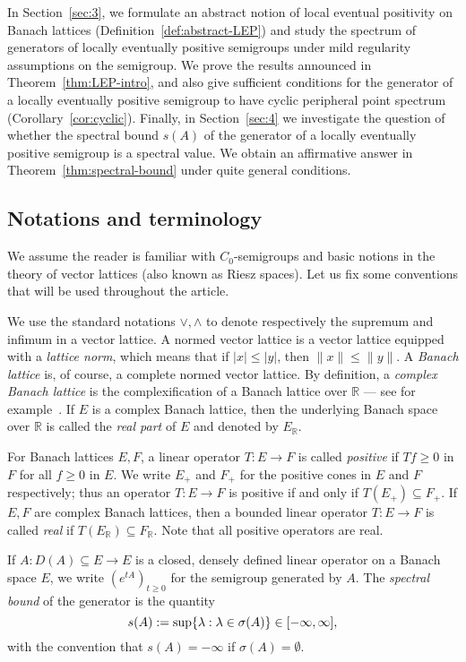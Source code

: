 \documentclass[sn-mathphys]{sn-jnl}%
\theoremstyle{thmstyleone}
\theoremstyle{thmstylethree}
\let\Re\relax
\DeclareMathOperator{\Re}{Re}
\newcommand{\RR}{\mathbb{R}}
\begin{document}
In Section~\ref{sec:3}, we formulate an abstract notion of local eventual positivity on Banach lattices (Definition~\ref{def:abstract-LEP}) and study the spectrum of generators of locally eventually positive semigroups under mild regularity assumptions on the semigroup. We prove the results announced in Theorem~\ref{thm:LEP-intro}, and also give sufficient conditions for the generator of a locally eventually positive semigroup to have cyclic peripheral point spectrum (Corollary~\ref{cor:cyclic}). Finally, in Section~\ref{sec:4} we investigate the question of whether the spectral bound $s(A)$ of the generator of a locally eventually positive semigroup is a spectral value. We obtain an affirmative answer in Theorem~\ref{thm:spectral-bound} under quite general conditions.

\subsection*{Notations and terminology}
We assume the reader is familiar with $C_0$-semigroups and basic notions in the theory of vector lattices (also known as Riesz spaces). Let us fix some conventions that will be used throughout the article.

We use the standard notations $\vee, \wedge$ to denote respectively the supremum and infimum in a vector lattice. A normed vector lattice is a vector lattice equipped with a \emph{lattice norm}, which means that if $\lvert x\rvert \le \lvert y\rvert$, then $\|x\|\le \|y\|$. A \emph{Banach lattice} is, of course, a complete normed vector lattice. By definition, a \emph{complex Banach lattice} is the complexification of a Banach lattice over $\RR$ --- see for example~\cite[II Section 11]{Sch}. If $E$ is a complex Banach lattice, then the underlying Banach space over $\RR$ is called the \emph{real part} of $E$ and denoted by $E_\RR$.

For Banach lattices $E, F$, a linear operator $T:E\to F$ is called \emph{positive} if $Tf\ge 0$ in $F$ for all $f\ge 0$ in $E$. We write $E_+$ and $F_+$ for the positive cones in $E$ and $F$ respectively; thus an operator $T:E\to F$ is positive if and only if $T(E_+)\subseteq F_+$. If $E, F$ are complex Banach lattices, then a bounded linear operator $T:E\to F$ is called \emph{real} if $T(E_\RR) \subseteq F_\RR$. Note that all positive operators are real.

If $A:D(A)\subseteq E\to E$ is a closed, densely defined linear operator on a Banach space $E$, we write $(e^{tA})_{t\ge 0}$ for the semigroup generated by $A$. The \emph{spectral bound} of the generator is the quantity
\begin{equation*}
	s(A) := \sup\{\Re\lambda : \lambda\in\sigma(A)\} \in [-\infty,\infty],
\end{equation*}
with the convention that $s(A)=-\infty$ if $\sigma(A)=\emptyset$.
\end{document}
